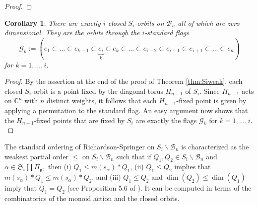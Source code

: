 \documentclass[12pt]{amsart}
\numberwithin{equation}{section}
\newtheorem{cor}[thm]{Corollary}
\newcommand{\fg}{\mbox{${\mathfrak g}$}}
\newcommand{\C}{\mbox{${\mathbb C}$}}
\newcommand{\B}{\mathcal{B}}
\newcommand{\ms}{m(s_{\alpha})}
\newcommand{\F}{\mathcal{F}}
\begin{document}
\begin{proof}
\end{proof}


\begin{cor}\label{c:closedSi}
There are exactly $i$ closed $S_{i}$-orbits on $\B_{n}$ all of which are zero dimensional.  
They are the orbits through the $i$-standard flags
\begin{equation}\label{eq:closedflags}
\mathcal{G}_{k}:=(e_{1}\subset \dots \subset e_{k-1}\subset\underbrace{e_{i}}_{k}\subset e_{k}\subset \dots\subset e_{i-2}\subset e_{i-1}\subset e_{i+1}\subset\dots \subset e_{n})
\end{equation}
for $k=1,\dots, i$.  
\end{cor}

\begin{proof}
By the assertion at the end of the proof of Theorem \ref{thm:Siweak}, each closed $S_i$-orbit is a point fixed by the diagonal torus $H_{n-1}$ of $S_i.$   Since $H_{n-1}$ acts on $\C^n$ with $n$ distinct weights, it follows that each $H_{n-1}$-fixed point
is given by applying a permutation to the standard flag.  An easy argument now shows that the $H_{n-1}$-fixed points that are fixed by $S_i$ are exactly the flags $\mathcal{G}_k$ for $k=1, \dots, i.$
\end{proof}


The standard ordering of Richardson-Springer on $S_i\backslash \B_n$ is characterized as the weakest partial order $\le$ on $S_i\backslash \B_n$ such that if $Q_1, Q_2 \in S_i\backslash \B_n$ and $\alpha \in \mathfrak{S}_i\coprod\Pi_{\fg},$ then (i) $Q_1 \le \ms * Q_1$, (ii) $Q_1 \le Q_2$ implies that $\ms * Q_1 \le \ms * Q_2$, and (iii) $Q_1 \le Q_2$ and $\dim(Q_2) \le \dim(Q_1)$ imply that $Q_1=Q_2$ (see Proposition 5.6 of \cite{RS}).  It can be computed in terms of the combinatorics of the monoid action and the closed orbits.
\end{document}

